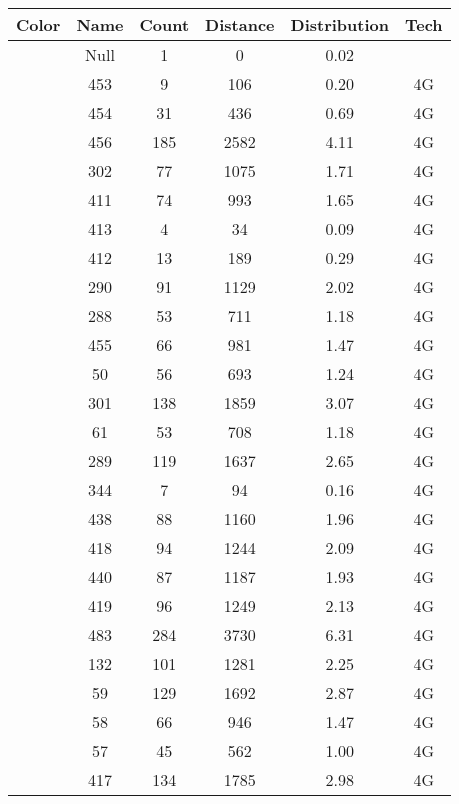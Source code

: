 \begin{longtable*}{|c|c|c|c|c|c|}\hline
{}
Color&Name&Count&Distance&Distribution&Tech\\\hline\hline
{} &Null&1&0&0.02&\\\hline
{} &453&9&106&0.20&4G\\\hline
{} &454&31&436&0.69&4G\\\hline
{} &456&185&2582&4.11&4G\\\hline
{} &302&77&1075&1.71&4G\\\hline
{} &411&74&993&1.65&4G\\\hline
{} &413&4&34&0.09&4G\\\hline
{} &412&13&189&0.29&4G\\\hline
{} &290&91&1129&2.02&4G\\\hline
{} &288&53&711&1.18&4G\\\hline
{} &455&66&981&1.47&4G\\\hline
{} &50&56&693&1.24&4G\\\hline
{} &301&138&1859&3.07&4G\\\hline
{} &61&53&708&1.18&4G\\\hline
{} &289&119&1637&2.65&4G\\\hline
{} &344&7&94&0.16&4G\\\hline
{} &438&88&1160&1.96&4G\\\hline
{} &418&94&1244&2.09&4G\\\hline
{} &440&87&1187&1.93&4G\\\hline
{} &419&96&1249&2.13&4G\\\hline
{} &483&284&3730&6.31&4G\\\hline
{} &132&101&1281&2.25&4G\\\hline
{} &59&129&1692&2.87&4G\\\hline
{} &58&66&946&1.47&4G\\\hline
{} &57&45&562&1.00&4G\\\hline
{} &417&134&1785&2.98&4G\\\hline

\end{longtable*}
